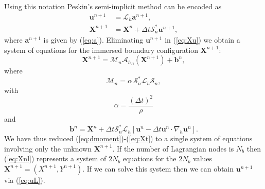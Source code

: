 \documentclass[preprint,12pt]{elsarticle}
\begin{document}
Using this notation Peskin's semi-implicit method  can be encoded as
\begin{align}
\mathbf{u}^{n+1} &= \mathcal{L}_h \mathbf{a}^{n+1}, \label{eq:uL} \\
\mathbf{X}^{n+1}&=\mathbf{X}^n +\Delta t\mathcal{S}^*_n\mathbf{u}^{n+1}, \label{eq:Xu}
\end{align}
where $ \mathbf{a}^{n+1}$ is given by (\ref{eq:a}). Eliminating $\mathbf{u}^{n+1}$ in (\ref{eq:Xu}) we obtain  a system of equations for the immersed boundary configuration $\mathbf{X}^{n+1}$:
\begin{equation}
\mathbf{X}^{n+1} = \mathcal{M}_n\mathcal{A}_{h_B} (\mathbf{X}^{n+1}) + \mathbf{b}^n, \label{eq:Xnl}
\end{equation}
where 
\begin{equation}
 \mathcal{M}_n =  \alpha \,  \mathcal{S}^*_n \mathcal{L}_h \mathcal{S}_n,
\end{equation}
with
\begin{equation}
\alpha = \frac{(\Delta t)^2}{\rho}
\end{equation}
and 
\begin{equation}
 \mathbf{b}^n = \mathbf{X}^n + \Delta t \mathcal{S}^*_n \mathcal{L}_h [\mathbf{u}^n-\Delta t \mathbf{u}^n \cdot
 \nabla_h \mathbf{u}^n]. \label{eq:bn}
\end{equation}
We have thus reduced (\ref{eq:dmoment})-(\ref{eq:Xt}) to a single system of  equations involving only the unknown $\mathbf{X}^{n+1}$. If the number of Lagrangian nodes is $N_b$ then (\ref{eq:Xnl}) represents a system of $2N_b$ equations for the 
$2N_b$ values $\mathbf{X}^{n+1}=(X^{n+1},Y^{n+1})$. If we can solve this system then we can obtain $\mathbf{u}^{n+1}$ via (\ref{eq:uL}). 
\end{document}
